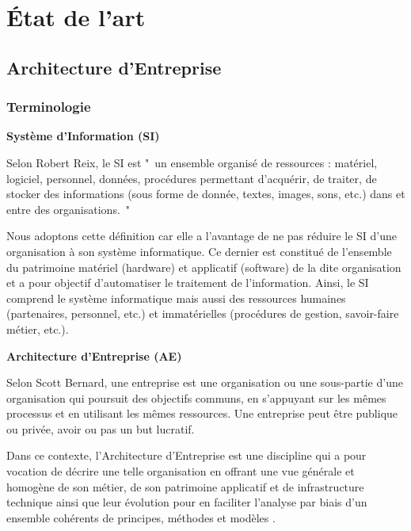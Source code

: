 \chapter{État de l'art}
\label{chap:Etat de l'art}

\section{Architecture d'Entreprise}

\subsection{Terminologie}

\textbf{Système d'Information (SI)}

Selon Robert Reix, le SI est "~un ensemble organisé de ressources : matériel, 
logiciel, personnel, données, procédures permettant d'acquérir, de traiter, de 
stocker des informations (sous forme de donnée, textes, images, sons, etc.) dans 
et entre des organisations.~"

Nous adoptons cette définition car elle a l'avantage de ne pas réduire le SI 
d'une organisation à son système informatique. Ce dernier est constitué de 
l'ensemble du patrimoine matériel (hardware) et applicatif (software) de la dite 
organisation et a pour objectif d'automatiser le traitement de l'information. 
Ainsi, le SI comprend le système informatique mais aussi des ressources humaines 
(partenaires, personnel, etc.) et immatérielles (procédures de gestion, 
savoir-faire métier, etc.).

\textbf{Architecture d'Entreprise  (AE)}

Selon Scott Bernard, une entreprise est une organisation ou une sous-partie d'une organisation qui poursuit des objectifs communs, en s'appuyant sur les mêmes processus et en utilisant les mêmes ressources. Une entreprise peut être publique ou privée, avoir ou pas un but lucratif. 

Dans ce contexte, l'Architecture d'Entreprise est une discipline qui a pour vocation de décrire une telle organisation en offrant une vue générale et homogène de son métier, de son patrimoine applicatif et de infrastructure technique ainsi que leur évolution pour en faciliter l'analyse par biais d'un ensemble cohérents de principes, méthodes et modèles \cite{lankhorst2009enterprise}.

